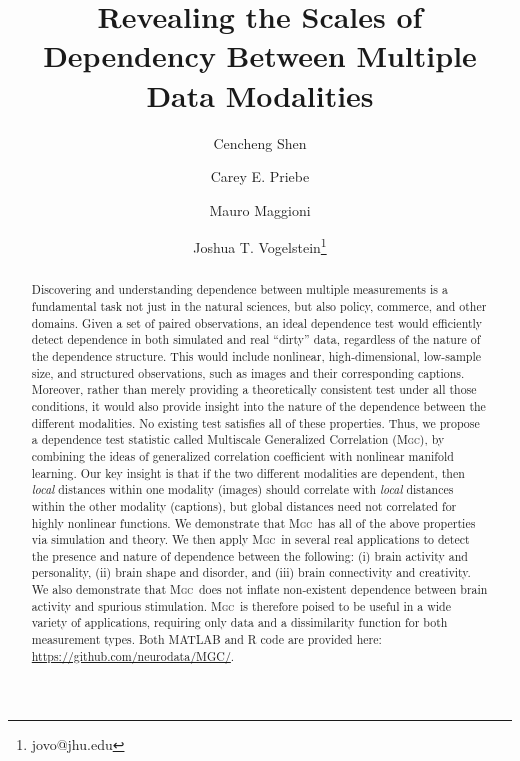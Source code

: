 \documentclass[11pt]{article}
\providecommand{\sct}[1]{{\normalfont\textsc{#1}}}
\newcommand{\Mgc}{\sct{Mgc}}
\newcommand{\website}{\url{https://github.com/neurodata/MGC/}}
\begin{document}
\def\spacingset#1{\renewcommand{\baselinestretch}%
{#1}\small\normalsize} \spacingset{1}

\title{\bf Revealing the Scales of Dependency Between Multiple Data Modalities}
\author[1,2]{Cencheng Shen} %
\author[2,3]{Carey E. Priebe}%
\author[4]{Mauro Maggioni}%
\author[2,5]{Joshua T. Vogelstein\thanks{jovo@jhu.edu}}
\maketitle

\begin{abstract}
Discovering and understanding dependence between multiple  measurements is a fundamental task not just in the natural sciences, but also policy, commerce, and other domains.
Given a set of paired observations, an ideal dependence test would efficiently detect dependence in both simulated and real ``dirty'' data, regardless of the nature of the dependence structure. This would include nonlinear,  high-dimensional, low-sample size, and structured observations, such as images and their corresponding captions.  Moreover, rather than merely providing a theoretically consistent test under all those conditions, it would also provide insight into the nature of the dependence between the different modalities.  
No existing test satisfies all of these properties.
Thus, we propose a dependence test statistic called Multiscale Generalized Correlation (\Mgc), by combining the ideas of generalized correlation coefficient with nonlinear manifold learning.
Our key insight is that if the two different modalities are dependent, then \emph{local} distances within one modality (images) should correlate with \emph{local} distances within the other modality (captions), but global distances need not correlated for highly nonlinear functions.  
We demonstrate that \Mgc~has all of the above properties via simulation and theory.
We then apply \Mgc~in several real applications to detect the presence and nature  of dependence between the following: (i)  brain activity and personality, (ii) brain shape and disorder, and (iii) brain connectivity and creativity. We also demonstrate that \Mgc~does not inflate non-existent dependence between brain activity and spurious stimulation.  
\Mgc~is therefore poised to be useful in a wide variety of applications, requiring only data and a dissimilarity function for both measurement types.  Both MATLAB and R code are provided here: \website.
\end{abstract}
\end{document}

